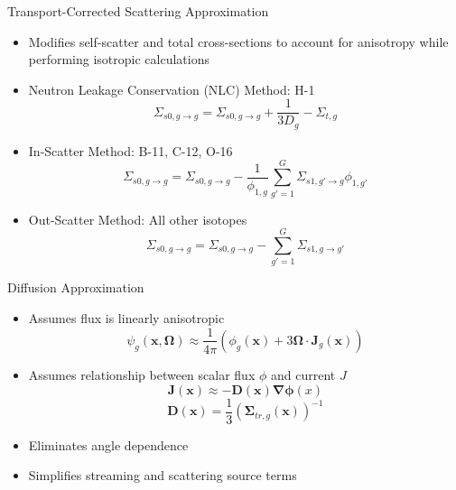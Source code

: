 
\begin{frame}[t]{Transport-Corrected Scattering Approximation}

  \begin{itemize}
    \item Modifies self-scatter and total cross-sections to account for 
    anisotropy while performing isotropic calculations
    \item Neutron Leakage Conservation (NLC) Method: H-1
    \begin{equation*}
    \Sigma_{s0,g\rightarrow g} = \Sigma_{s0,g\rightarrow g} + \frac{1}{3D_g} 
    - \Sigma_{t,g}
    \end{equation*}
    \item In-Scatter Method: B-11, C-12, O-16
    \begin{equation*}
    \Sigma_{s0,g\rightarrow g} = \Sigma_{s0,g\rightarrow g} - 
    \frac{1}{\phi_{1,g}}\sum_{g'=1}^G \Sigma_{s1,g'\rightarrow g}\phi_{1,g'}
    \end{equation*}
    \item Out-Scatter Method: All other isotopes
    \begin{equation*}
    \Sigma_{s0,g\rightarrow g} = \Sigma_{s0,g\rightarrow g} - \sum_{g'=1}^G 
    \Sigma_{s1,g\rightarrow g'}
    \end{equation*}
  \end{itemize}

\end{frame}


\begin{frame}[t]{Diffusion Approximation}
    
    \begin{itemize}
      \item Assumes flux is linearly anisotropic
      \begin{equation*}
       \psi_g\left(\bm x,\bm \Omega\right) \approx 
       \frac{1}{4\pi}\left(\phi_g\left(\bm x\right) + 3\bm \Omega \cdot \bm 
       J_g\left(\bm x\right)\right)
      \end{equation*}
      \item Assumes relationship between scalar flux $\phi$ and current $J$
      \begin{equation*}
      \bm J\left(\bm x\right) \approx -\bm D\left(\bm x\right) \bm \nabla 
      \bm \phi\left(x\right)
      \end{equation*}
      \begin{equation*}
      \bm D\left(\bm x\right)  = \frac{1}{3}\left(\bm \Sigma_{tr,g}\left(\bm 
      x\right)\right)^{-1}
      \end{equation*}
      \item Eliminates angle dependence
      \item Simplifies streaming and scattering source terms
    \end{itemize}
  
\end{frame}

